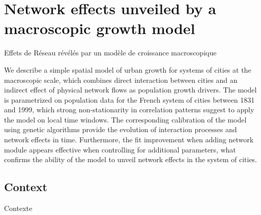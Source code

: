 



\newpage



\section[Unveiling Network Effects][Effets de Réseaux]{Network effects unveiled by a macroscopic growth model}{Effets de Réseau révélés par un modèle de croissance macroscopique}

\label{sec:interactiongibrat}






We describe a simple spatial model of urban growth for systems of cities at the macroscopic scale, which combines direct interaction between cities and an indirect effect of physical network flows as population growth drivers. The model is parametrized on population data for the French system of cities between 1831 and 1999, which strong non-stationarity in correlation patterns suggest to apply the model on local time windows. The corresponding calibration of the model using genetic algorithms provide the evolution of interaction processes and network effects in time. Furthermore, the fit improvement when adding network module appears effective when controlling for additional parameters, what confirms the ability of the model to unveil network effects in the system of cities.



\subsection{Context}{Contexte}



